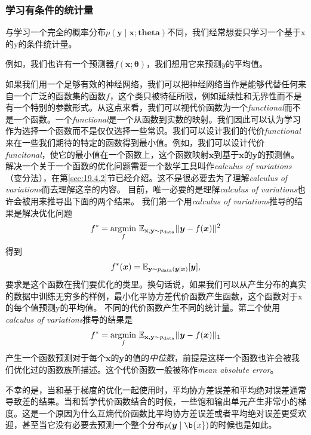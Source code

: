 \subsubsection{学习有条件的统计量 }
\label{sec:6.2.1.2}

与学习一个完全的概率分布$p(\bm{y}\mid\bm{x};\bm{theta})$不同，我们经常想要只学习一个基于x的y的条件统计量。

例如，我们也许有一个预测器$f(\bm{x};\bm{\theta})$，我们想用它来预测$y$的平均值。

如果我们用一个足够有效的神经网络，我们可以把神经网络当作是能够代替任何来自一个广泛的函数集的函数$f$，这个类只被特征所限，例如延续性和无界性而不是有一个特别的参数形式。从这点来看，我们可以视代价函数为一个\emph{functional}而不是一个函数。一个\emph{functional}是一个从函数到实数的映射。我们因此可以认为学习作为选择一个函数而不是仅仅选择一些常识。我们可以设计我们的代价\emph{functional}来在一些我们期待的特定的函数得到最小值。例如，我们可以设计代价\emph{funcitonal}，使它的最小值在一个函数上，这个函数映射$\bm{x}$到基于$\bm{x}$的$\bm{y}$的预测值。解决一个关于一个函数的优化问题需要一个数学工具叫作\emph{calculus of variations}（变分法），在第\ref{sec:19.4.2}节已经介绍。这不是很必要去为了理解\emph{calculus of variations}而去理解这章的内容。 目前，唯一必要的是理解\emph{calculus of variations}也许会被用来推导出下面的两个结果。
我们第一个用\emph{calculus of variations}推导的结果是解决优化问题
\begin{equation}
f^* = \underset{f}{\arg\!\min}  \ \mathbb{E}_{\mathbf{x}, \mathbf{y} \sim  p_\text{data}} ||\bm{y}-f(\bm{x})||^2
\end{equation}
得到
\begin{equation}
f^*(\bm{x}) = \mathbb{E}_{\mathbf{y}\sim p_\text{data}(\bm{y}|\bm{x})} [\bm{y}],
\end{equation}
要求是这个函数在我们要优化的类里。换句话说，如果我们可以从产生分布的真实的数据中训练无穷多的样例，最小化平协方差代价函数产生函数，这个函数对于x的每个值预测y的平均值。
不同的代价函数产生不同的统计量。第二个使用\emph{calculus of variations}推导的结果是
\begin{equation}
f^* = \underset{f}{\arg\!\min} \ \mathbb{E}_{\mathbf{x}, \mathbf{y} \sim  p_\text{data}} ||\bm{y} - f(\bm{x})||_1
\end{equation}
产生一个函数预测对于每个$\bm{x}$的$\bm{y}$的值的\emph{中位数}，前提是这样一个函数也许会被我们优化过的函数族所描述。这个代价函数一般被称作\emph{mean absolute error}。

不幸的是，当和基于梯度的优化一起使用时，平均协方差误差和平均绝对误差通常导致差的结果。当和哲学代价函数结合的时候，一些饱和输出单元产生非常小的梯度。这是一个原因为什么互熵代价函数比平均协方差误差或者平均绝对误差更受欢迎，甚至当它没有必要去预测一个整个分布$p(\bm{y}\mid\b{x})$的时候也是如此。

